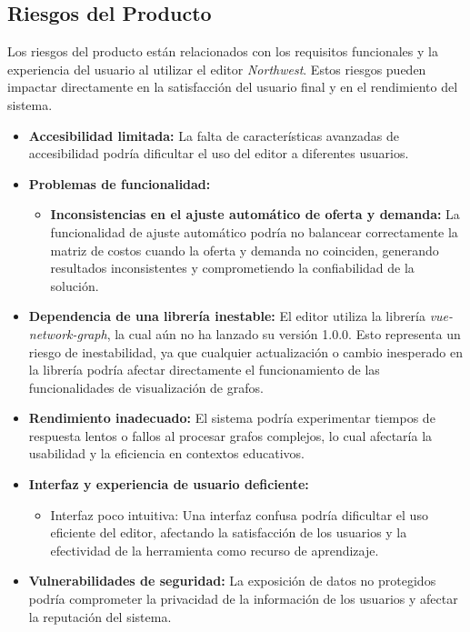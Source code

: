 \documentclass[stu, 12pt, letterpaper, donotrepeattitle, floatsintext, natbib]{apa7}
\begin{document}
\subsection{Riesgos del Producto}
Los riesgos del producto están relacionados con los requisitos funcionales y la experiencia del usuario al utilizar el editor \textit{Northwest}. Estos riesgos pueden impactar directamente en la satisfacción del usuario final y en el rendimiento del sistema.

\begin{itemize}
    \item \textbf{Accesibilidad limitada:} La falta de características avanzadas de accesibilidad podría dificultar el uso del editor a diferentes usuarios.

    \item \textbf{Problemas de funcionalidad:} 
    \begin{itemize}
        \item \textbf{Inconsistencias en el ajuste automático de oferta y demanda:} La funcionalidad de ajuste automático podría no balancear correctamente la matriz de costos cuando la oferta y demanda no coinciden, generando resultados inconsistentes y comprometiendo la confiabilidad de la solución.
    \end{itemize}
    
    \item \textbf{Dependencia de una librería inestable:} El editor utiliza la librería \textit{vue-network-graph}, la cual aún no ha lanzado su versión 1.0.0. Esto representa un riesgo de inestabilidad, ya que cualquier actualización o cambio inesperado en la librería podría afectar directamente el funcionamiento de las funcionalidades de visualización de grafos.

    \item \textbf{Rendimiento inadecuado:} El sistema podría experimentar tiempos de respuesta lentos o fallos al procesar grafos complejos, lo cual afectaría la usabilidad y la eficiencia en contextos educativos.

    \item \textbf{Interfaz y experiencia de usuario deficiente:} 
    \begin{itemize}
        \item Interfaz poco intuitiva: Una interfaz confusa podría dificultar el uso eficiente del editor, afectando la satisfacción de los usuarios y la efectividad de la herramienta como recurso de aprendizaje.
    \end{itemize}
    
    \item \textbf{Vulnerabilidades de seguridad:} La exposición de datos no protegidos podría comprometer la privacidad de la información de los usuarios y afectar la reputación del sistema.
\end{itemize}
\end{document}
